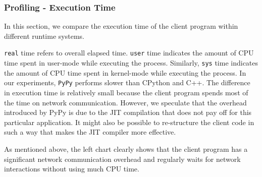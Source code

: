 \subsubsection{Profiling - Execution Time}
In this section, we compare the execution time of the client program within different runtime systems. 

\texttt{real} time refers to overall elapsed time. \texttt{user} time indicates the amount of CPU time spent in user-mode while executing the process. Similarly, \texttt{sys} time indicates the amount of CPU time spent in kernel-mode while executing the process. In our experiments, \texttt{PyPy} performs slower than CPython and C++. The difference in execution time is relatively small because the client program spends most of the time on network communication. However, we speculate that the overhead introduced by PyPy is due to the JIT compilation that does not pay off for this particular application. It might also be possible to re-structure the client code in such a way that makes the JIT compiler more effective. 

\begin{figure}[H]
\end{figure}

As mentioned above, the left chart clearly shows that the client program has a significant network communication overhead and regularly waits for network interactions without using much CPU time.

